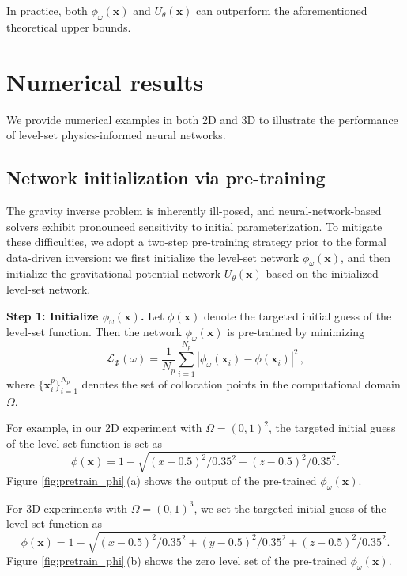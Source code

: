 \documentclass[final,hidelinks,onefignum,onetabnum]{siamart251216}
\begin{document}
In practice, both $\phi_\omega(\mathbf{x})$ and $U_\theta(\mathbf{x})$ can outperform the aforementioned theoretical upper bounds.

\section{Numerical results}
\label{sec:results}
We provide numerical examples in both 2D and 3D to illustrate the performance of level-set physics-informed neural networks.

\subsection{Network initialization via pre-training}

The gravity inverse problem is inherently ill-posed, and neural-network-based solvers exhibit pronounced sensitivity to initial parameterization. To mitigate these difficulties, we adopt a two-step pre-training strategy prior to the formal data-driven inversion: we first initialize the level-set network $\phi_{\omega}(\mathbf{x})$, and then initialize the gravitational potential network $U_{\theta}(\mathbf{x})$ based on the initialized level-set network.

\noindent \textbf{Step 1: Initialize $\phi_{\omega}(\mathbf{x})$.}
Let $\phi(\mathbf{x})$ denote the targeted initial guess of the level-set function. Then the network $\phi_{\omega}(\mathbf{x})$ is pre-trained by minimizing
\begin{equation}
	\mathcal{L}_{\Phi}(\omega) = \frac{1}{N_p} \sum_{i=1}^{N_p} \left|\phi_{\omega}(\mathbf{x}_i) - \phi(\mathbf{x}_i)\right|^2\,,
\end{equation}
where $\big\{\mathbf{x}_i^p\big\}_{i=1}^{N_p}$ denotes the set of collocation points in the computational domain $\Omega$.

For example, in our 2D experiment with $\Omega = (0,1)^2$, the targeted initial guess of the level-set function is set as
\begin{equation}
	\phi(\mathbf{x}) = 1 - \sqrt{(x-0.5)^2/0.35^2 + (z-0.5)^2/0.35^2}.
\end{equation}
Figure \ref{fig:pretrain_phi}\,(a) shows the output of the pre-trained $\phi_{\omega}(\mathbf{x})$.

For 3D experiments with $\Omega = (0,1)^3$, we set the targeted initial guess of the level-set function as
\begin{equation}
	\phi(\mathbf{x}) = 1 - \sqrt{(x-0.5)^2/0.35^2 + (y-0.5)^2/0.35^2 + (z-0.5)^2/0.35^2}.
\end{equation}
Figure \ref{fig:pretrain_phi}\,(b) shows the zero level set of the pre-trained $\phi_{\omega}(\mathbf{x})$.
\end{document}
